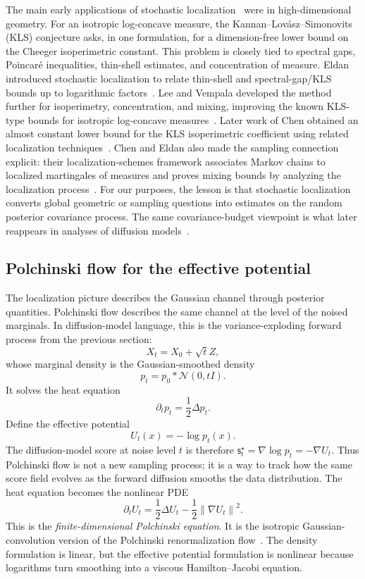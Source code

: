 \documentclass[10pt,a4paper]{amsart}
\numberwithin{equation}{section}
\newcommand{\Id}{I}
\newcommand{\norm}[1]{\left\lVert #1 \right\rVert}
\newcommand{\sstar}{\mathsf{s}^{\star}}
\newcommand{\normal}[2]{\mathcal{N}\!\left(#1,#2\right)}
\begin{document}
The main early applications of stochastic localization~\cite{eldan2013thinshell}
were in high-dimensional geometry.  For an isotropic log-concave measure, the
Kannan--Lov\'asz--Simonovits (KLS) conjecture asks, in one formulation, for a
dimension-free lower bound on the Cheeger isoperimetric constant.  This problem
is closely tied to spectral gaps, Poincar\'e inequalities, thin-shell estimates,
and concentration of measure.
Eldan introduced stochastic localization to relate thin-shell and
spectral-gap/KLS bounds up to logarithmic factors~\cite{eldan2013thinshell}.
Lee and Vempala developed the method further for isoperimetry, concentration,
and mixing, improving the known KLS-type bounds for isotropic log-concave
measures~\cite{lee2017eldans}.  Later work of Chen obtained an almost constant
lower bound for the KLS isoperimetric coefficient using related localization
techniques~\cite{chen2021kls}.  Chen and Eldan also made the sampling connection
explicit: their localization-schemes framework associates Markov chains to
localized martingales of measures and proves mixing bounds by analyzing the
localization process~\cite{chen2022localizationschemes}.  For our purposes, the
lesson is that stochastic localization converts global geometric or sampling
questions into estimates on the random posterior covariance process.  The same
covariance-budget viewpoint is what later reappears in analyses of diffusion
models~\cite{montanari2023sampling,benton2024nearlydlinear}.

\subsection{Polchinski flow for the effective potential}

The localization picture describes the Gaussian channel through posterior
quantities.  Polchinski flow describes the same channel at the level of the
noised marginals.  In diffusion-model language, this is the variance-exploding
forward process from the previous section:
\[
    X_t=X_0+\sqrt{t}Z,
\]
whose marginal density is the Gaussian-smoothed density
\[
    p_t=p_0*\normal{0}{t\Id}.
\]
It solves the heat equation
\begin{equation}\label{eq:heat-flow-density}
    \partial_t p_t=\frac12\Delta p_t.
\end{equation}
Define the effective potential
\[
    U_t(x)=-\log p_t(x).
\]
The diffusion-model score at noise level $t$ is therefore
$\sstar_t=\nabla\log p_t=-\nabla U_t$.  Thus Polchinski flow is not a
new sampling process; it is a way to track how the same score field evolves as
the forward diffusion smooths the data distribution.
The heat equation becomes the nonlinear PDE
\begin{equation}\label{eq:polchinski-finite}
    \partial_t U_t
    =
    \frac12\Delta U_t
    -
    \frac12\norm{\nabla U_t}^2.
\end{equation}
This is the \emph{finite-dimensional
Polchinski equation}.  It is the isotropic Gaussian-convolution version of the
Polchinski renormalization
flow~\cite{polchinski1984renormalization,bauerschmidt2024polchinski}.
The density formulation is linear, but the effective potential formulation is
nonlinear because logarithms turn smoothing into a viscous Hamilton--Jacobi
equation.
\end{document}
